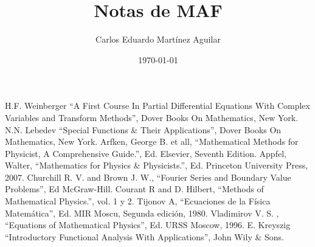 \documentclass[letterpaper]{book}
\author{Carlos Eduardo Martínez Aguilar}
\date{\today}
\title{Notas de MAF}
\begin{document}
\maketitle
\tableofcontents



%

\begin{thebibliography}{9}

 H.F. Weinberger ``A First Course In Partial Differential Equations With Complex Variables and Transform Methods'', Dover Books On Mathematics, New York.
 N.N. Lebedev ``Special Functions \& Their Applications'', Dover Books On Mathematics, New York.
 Arfken, George B. et all, ``Mathematical Methods for Physicist, A Comprehensive Guide.'', Ed. Elsevier, Seventh Edition.
 Appfel, Walter, ``Mathematics for Physics \& Physicists.'', Ed. Princeton University Press, 2007.
 Churchill R. V. and Brown J. W., ``Fourier Series and Boundary Value Problems'', Ed McGraw-Hill.
 Courant R and D. Hilbert, ``Methods of Mathematical Physics.'', vol. 1 y 2.
 Tijonov A, ``Ecuaciones de la Física Matemática'', Ed. MIR Moscu, Segunda edición, 1980.
 Vladimirov V. S. , ``Equations of Mathematical Physics'', Ed. URSS Moscow, 1996.
 E. Kreyszig ``Introductory Functional Analysis With Applications'', John Wily \& Sons.

\end{thebibliography}
\end{document}
